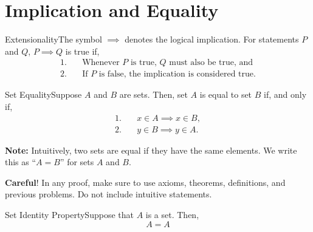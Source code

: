 \section{Implication and Equality}

\vspace*{\fill}

\begin{definition}
    {Extensionality}The symbol \(\implies\) denotes the logical implication. For statements \(P\) and \(Q\), \(P \implies Q\) is true if,
    \begin{align*}
        1. & \quad \text{Whenever } P \text{ is true, } Q \text{ must also be true, and} \\
        2. & \quad \text{If } P \text{ is false, the implication is considered true.}
    \end{align*}
\end{definition}

\begin{axiom}
    {Set Equality}Suppose \(A\) and \(B\) are sets. Then, set \(A\) is equal to set \(B\) if, and only if,
    \begin{align*}
        1. & \quad x \in A \implies x \in B, \\
        2. & \quad y \in B \implies y \in A.
    \end{align*}
\end{axiom}

\begin{note}
    \textbf{Note:} Intuitively, two sets are equal if they have the same elements. We write this as ``\(A = B\)'' for sets \(A\) and \(B\). 

    \hspace{0.5em}\textbf{Careful}! In any proof, make sure to use axioms, theorems, definitions, and previous problems. Do not include intuitive statements.
\end{note}



\begin{exercise}
    {Set Identity Property}Suppose that \(A\) is a set. Then, \[A = A\]
\end{exercise}


